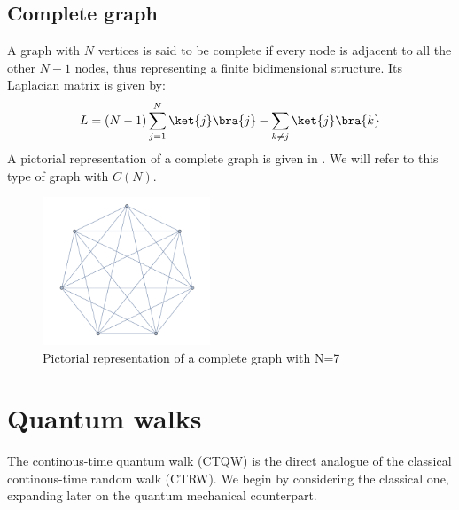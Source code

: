     \subsection{Complete graph}\label{subsec:complete graph}
        A graph with $N$ vertices is said to be complete if every node is adjacent to all the other $N-1$ nodes, thus representing a finite bidimensional structure. Its Laplacian matrix is given by:
        \begin{equation}
            L = (N-1)\sum_{j=1}^{N}\ket{j}\bra{j} - \sum_{k\neq j}\ket{j}\bra{k}
        \end{equation}
        A pictorial representation of a complete graph is given in . We will refer to this type of graph with $C(N)$.
        \begin{figure}[hb]
          \centering
          \includegraphics[width=50mm]{./figures/chapter1/complete}
          \caption[Pictorial representation of a complete graph]{Pictorial representation of a complete graph with N=7}
          \label{fig:complete_graph_pictorial}
        \end{figure}

\section{Quantum walks}\label{sec:quantum walks}
The continous-time quantum walk (CTQW) is the direct analogue of the classical continous-time random walk (CTRW). We begin by considering the classical one, expanding later on the quantum mechanical counterpart. \nocite{Mulken2011} \\

